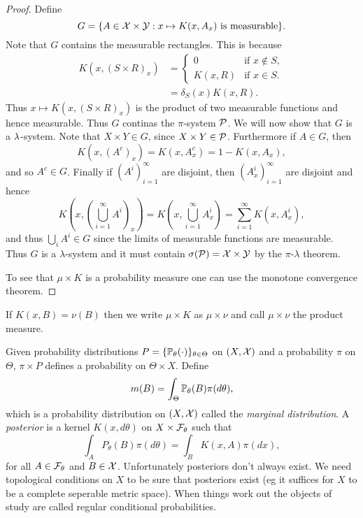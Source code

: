 \begin{proof}
    Define 
    \[G = \{A \in {\mathcal{X}} \times \mathcal{Y} : x \mapsto K(x,A_x) \text{ is measurable}\}. \]
    Note that $G$ contains the measurable rectangles. This is because 
    \begin{align*}
        K(x,(S\times R)_x) &=\begin{cases}
            0 & \text{if } x \notin S,\\
            K(x,R) & \text{if } x \in S.   
        \end{cases}\\
        &= \delta_S(x)K(x,R).
    \end{align*}
    Thus $x \mapsto K(x,(S\times R)_x)$ is the product of two measurable functions and hence measurable. Thus $G$ continas the $\pi$-system ${\mathcal{P}}$. We will now show that $G$ is a $\lambda$-system. Note that $X \times Y \in G$, since $X \times Y \in {\mathcal{P}}$. Furthermore if $A \in G$, then 
    \[K(x,(A^c)_x) = K(x,A_x^c) = 1-K(x,A_x), \]
    and so $A^c \in G$. Finally if $(A^i)_{i=1}^\infty$ are disjoint, then $(A^i_x)_{i=1}^\infty$ are disjoint and hence
    \[ K\left(x,\left(\bigcup_{i=1}^\infty A^i\right)_x\right) = K\left(x,\bigcup_{i=1}^\infty A_x^i\right) =\sum_{i=1}^\infty K(x,A_x^i),\]
    and thus $\bigcup_i A^i \in G$ since the limits of measurable functions are measurable. Thus $G$ is a $\lambda$-system and it must contain $\sigma({\mathcal{P}}) = {\mathcal{X}} \times \mathcal{Y}$ by the $\pi$-$\lambda$ theorem.

    To see that $\mu \times K$ is a probability measure one can use the monotone convergence theorem.
\end{proof}
\begin{ex}
    If $K(x,B) = \nu(B)$ then we write $\mu \times K$ as $\mu \times \nu$ and call $\mu \times \nu$ the product measure.
\end{ex}
\begin{ex}
     Given probability distributions $P=\{{\mathbb{P}}_\theta(\cdot)\}_{\theta \in \Theta}$ on $(X,{\mathcal{X}})$ and a probability $\pi$ on $\Theta$, $\pi \times P$ defines a probability on $\Theta \times X$. Define 
    \[m(B) = \int_\Theta {\mathbb{P}}_\theta(B)\pi(d\theta), \]
    which is a probability distribution on $(X,{\mathcal{X}})$ called the \emph{marginal distribution}. A \emph{posterior} is a kernel $K(x,d\theta)$ on $X \times {\mathcal{F}}_\theta$ such that
    \[\int_A P_\theta(B)\pi(d\theta) = \int_B K(x,A)\pi(dx), \]
    for all $A \in {\mathcal{F}}_\theta$ and $B \in {\mathcal{X}}$. Unfortunately posteriors don't always exist. \grumpy We need topological conditions on $X$ to be sure that posteriors exist (eg it suffices for $X$ to be a complete seperable metric space). When things work out the objects of study are called regular conditional probabilities.
\end{ex}

